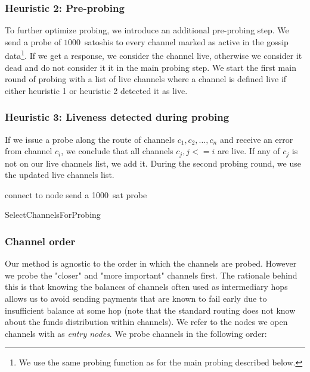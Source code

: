 \subsubsection{Heuristic 2: Pre-probing}
To further optimize probing, we introduce an additional pre-probing step.
We send a probe of $1000$~satoshis to every channel marked as active in the gossip data\footnote{We use the same probing function as for the main probing described below.}.
If we get a response, we consider the channel live, otherwise we consider it dead and do not consider it it in the main probing step.
We start the first main round of probing with a list of live channels where a channel is defined live if either heuristic 1 or heuristic 2 detected it as live.

\subsubsection{Heuristic 3: Liveness detected during probing}
If we issue a probe along the route of channels $c_1, c_2, \dots, c_n$ and receive an error from channel $c_i$, we conclude that all channels $c_j, j<=i$ are live.
If any of $c_j$ is not on our live channels list, we add it.
During the second probing round, we use the updated live channels list.

\begin{algorithm}
	 {
		connect to node\;
	}
	 {
		send a 1000~sat probe\;
	}
	\caption{SelectChannelsForProbing}
	\label{alg:select-channels}
\end{algorithm}


\subsubsection{Channel order}
Our method is agnostic to the order in which the channels are probed.
However we probe the "closer" and "more important" channels first.
The rationale behind this is that knowing the balances of channels often used as intermediary hops allows us to avoid sending payments that are known to fail early due to insufficient balance at some hop (note that the standard routing does not know about the funds distribution within channels).
We refer to the nodes we open channels with as \textit{entry nodes}.
We probe channels in the following order:

